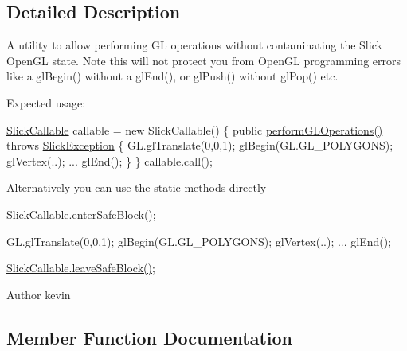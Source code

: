 \subsection{Detailed Description}
A utility to allow performing GL operations without contaminating the Slick Open\+GL state. Note this will not protect you from Open\+GL programming errors like a gl\+Begin() without a gl\+End(), or gl\+Push() without gl\+Pop() etc.

Expected usage\+:

{\ttfamily  \mbox{\hyperlink{classorg_1_1newdawn_1_1slick_1_1opengl_1_1_slick_callable}{Slick\+Callable}} callable = new Slick\+Callable() \{ public \mbox{\hyperlink{classorg_1_1newdawn_1_1slick_1_1opengl_1_1_slick_callable_aa7b2c33eb1b68c7203cc9abdf6b33fc6}{perform\+G\+L\+Operations()}} throws \mbox{\hyperlink{classorg_1_1newdawn_1_1slick_1_1_slick_exception}{Slick\+Exception}} \{ G\+L.\+gl\+Translate(0,0,1); gl\+Begin(G\+L.\+G\+L\+\_\+\+P\+O\+L\+Y\+G\+O\+NS); gl\+Vertex(..); ... gl\+End(); \} \} callable.\+call(); }

Alternatively you can use the static methods directly

{\ttfamily  \mbox{\hyperlink{classorg_1_1newdawn_1_1slick_1_1opengl_1_1_slick_callable_a7a7a650d0708c6360dfd3e2a59d99828}{Slick\+Callable.\+enter\+Safe\+Block()}};}

{\ttfamily G\+L.\+gl\+Translate(0,0,1); gl\+Begin(G\+L.\+G\+L\+\_\+\+P\+O\+L\+Y\+G\+O\+NS); gl\+Vertex(..); ... gl\+End();}

{\ttfamily \mbox{\hyperlink{classorg_1_1newdawn_1_1slick_1_1opengl_1_1_slick_callable_acfce604d621582d39c7466096f46af47}{Slick\+Callable.\+leave\+Safe\+Block()}}; }

\begin{DoxyAuthor}{Author}
kevin 
\end{DoxyAuthor}


\subsection{Member Function Documentation}
\mbox{\label{classorg_1_1newdawn_1_1slick_1_1opengl_1_1_slick_callable_abbd1e9cef2e0f82396c35e69a1887b48}} 
